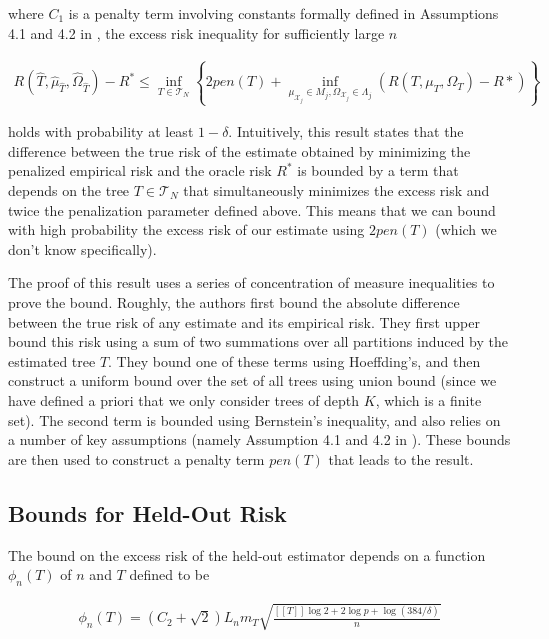 \documentclass[12pt]{article}
\begin{document}
where $C_1$ is a penalty term involving constants formally defined in
Assumptions 4.1 and 4.2 in \cite{liu2010}, the excess risk inequality
for sufficiently large $n$

\begin{align}
    R(\hat{T}, \hat{\mu}_{\hat{T}}, \hat{\Omega}_{\hat{T}}) - R^*
    \le \underset{T \in \mathcal{T}_N}{\inf} \left\{
        2 pen(T)
        + \underset{\mu_{\mathcal{X}_j} \in M_j,\Omega_{\mathcal{X}_j} \in \Lambda_j}{\inf}
        (R(T, \mu_T, \Omega_T) - R*)
    \right\}
\end{align}

holds with probability at least $1 - \delta$. Intuitively, this result
states that the difference between the true risk of the estimate
obtained by minimizing the penalized empirical risk and the oracle
risk $R^*$ is bounded by a term that depends on the tree $T \in
\mathcal{T}_N$ that simultaneously minimizes the excess risk and twice
the penalization parameter defined above. This means that we can bound
with high probability the excess risk of our estimate using $2 pen(T)$
(which we don't know specifically).

The proof of this result uses a series of concentration of measure
inequalities to prove the bound. Roughly, the authors first bound the
absolute difference between the true risk of any estimate and its
empirical risk. They first upper bound this risk using a sum of two
summations over all partitions induced by the estimated tree $T$. They
bound one of these terms using Hoeffding's, and then construct a
uniform bound over the set of all trees using union bound (since we
have defined a priori that we only consider trees of depth $K$, which
is a finite set). The second term is bounded using Bernstein's
inequality, and also relies on a number of key assumptions (namely
Assumption 4.1 and 4.2 in \cite{liu2010}). These bounds are then used
to construct a penalty term $pen(T)$ that leads to the result.

\subsection{Bounds for Held-Out Risk}

The bound on the excess risk of the held-out estimator depends on a
function $\phi_n(T)$ of $n$ and $T$ defined to be

\begin{align}
    \phi_n(T) = (C_2 + \sqrt{2}) L_n m_T
    \sqrt{
        \frac{[[T]] \log 2 + 2 \log p + \log(384/\delta)}{n}
    }
\end{align}
\end{document}
